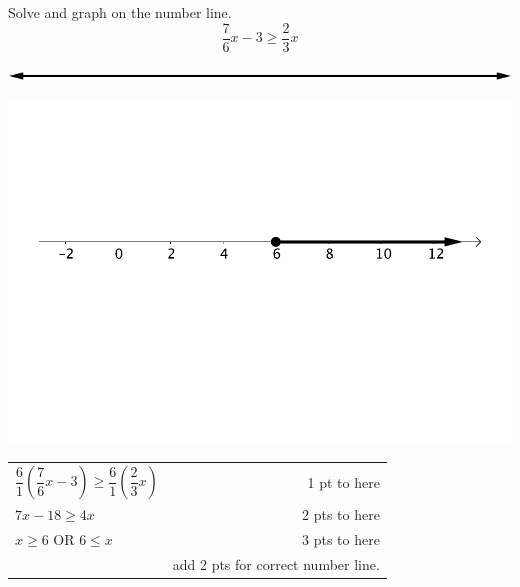 

{
	Solve and graph on the number line. $$\frac{7}{6}x-3 \geq \frac{2}{3}x$$\begin{onlyproblem}\begin{center}\includegraphics{numberLineNoNumbersNoTicks}\end{center}\end{onlyproblem} \begin{onlysolution}\begin{center}\includegraphics{fig095-07-5-b-answer}\end{center}\end{onlysolution}
}
{
	\begin{tabular}{l r}
	$\dfrac{6}{1}\left(\dfrac{7}{6}x-3\right) \geq \dfrac{6}{1}\left(\dfrac{2}{3}x\right)$ & 1 pt to here \\
	$7x-18\geq 4x$ & 2 pts to here \\
	$x\geq 6$ OR $6\leq x$ & 3 pts to here \\
	 & add 2 pts for correct number line.
	\end{tabular}
}

